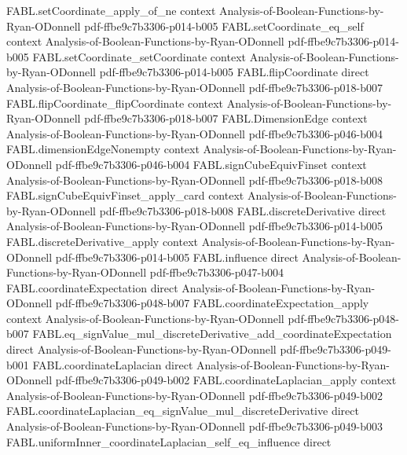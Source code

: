 \begin{theorem}
\proofstep
  {FABL.setCoordinate_apply_of_ne}
  {context}
  {Analysis-of-Boolean-Functions-by-Ryan-ODonnell}
  {pdf-ffbe9c7b3306-p014-b005}
\proofstep
  {FABL.setCoordinate_eq_self}
  {context}
  {Analysis-of-Boolean-Functions-by-Ryan-ODonnell}
  {pdf-ffbe9c7b3306-p014-b005}
\proofstep
  {FABL.setCoordinate_setCoordinate}
  {context}
  {Analysis-of-Boolean-Functions-by-Ryan-ODonnell}
  {pdf-ffbe9c7b3306-p014-b005}
\proofstep
  {FABL.flipCoordinate}
  {direct}
  {Analysis-of-Boolean-Functions-by-Ryan-ODonnell}
  {pdf-ffbe9c7b3306-p018-b007}
\proofstep
  {FABL.flipCoordinate_flipCoordinate}
  {context}
  {Analysis-of-Boolean-Functions-by-Ryan-ODonnell}
  {pdf-ffbe9c7b3306-p018-b007}
\proofstep
  {FABL.DimensionEdge}
  {context}
  {Analysis-of-Boolean-Functions-by-Ryan-ODonnell}
  {pdf-ffbe9c7b3306-p046-b004}
\proofstep
  {FABL.dimensionEdgeNonempty}
  {context}
  {Analysis-of-Boolean-Functions-by-Ryan-ODonnell}
  {pdf-ffbe9c7b3306-p046-b004}
\proofstep
  {FABL.signCubeEquivFinset}
  {context}
  {Analysis-of-Boolean-Functions-by-Ryan-ODonnell}
  {pdf-ffbe9c7b3306-p018-b008}
\proofstep
  {FABL.signCubeEquivFinset_apply_card}
  {context}
  {Analysis-of-Boolean-Functions-by-Ryan-ODonnell}
  {pdf-ffbe9c7b3306-p018-b008}
\proofstep
  {FABL.discreteDerivative}
  {direct}
  {Analysis-of-Boolean-Functions-by-Ryan-ODonnell}
  {pdf-ffbe9c7b3306-p014-b005}
\proofstep
  {FABL.discreteDerivative_apply}
  {context}
  {Analysis-of-Boolean-Functions-by-Ryan-ODonnell}
  {pdf-ffbe9c7b3306-p014-b005}
\proofstep
  {FABL.influence}
  {direct}
  {Analysis-of-Boolean-Functions-by-Ryan-ODonnell}
  {pdf-ffbe9c7b3306-p047-b004}
\proofstep
  {FABL.coordinateExpectation}
  {direct}
  {Analysis-of-Boolean-Functions-by-Ryan-ODonnell}
  {pdf-ffbe9c7b3306-p048-b007}
\proofstep
  {FABL.coordinateExpectation_apply}
  {context}
  {Analysis-of-Boolean-Functions-by-Ryan-ODonnell}
  {pdf-ffbe9c7b3306-p048-b007}
\proofstep
  {FABL.eq_signValue_mul_discreteDerivative_add_coordinateExpectation}
  {direct}
  {Analysis-of-Boolean-Functions-by-Ryan-ODonnell}
  {pdf-ffbe9c7b3306-p049-b001}
\proofstep
  {FABL.coordinateLaplacian}
  {direct}
  {Analysis-of-Boolean-Functions-by-Ryan-ODonnell}
  {pdf-ffbe9c7b3306-p049-b002}
\proofstep
  {FABL.coordinateLaplacian_apply}
  {context}
  {Analysis-of-Boolean-Functions-by-Ryan-ODonnell}
  {pdf-ffbe9c7b3306-p049-b002}
\proofstep
  {FABL.coordinateLaplacian_eq_signValue_mul_discreteDerivative}
  {direct}
  {Analysis-of-Boolean-Functions-by-Ryan-ODonnell}
  {pdf-ffbe9c7b3306-p049-b003}
\proofstep
  {FABL.uniformInner_coordinateLaplacian_self_eq_influence}
  {direct}

\end{theorem}
